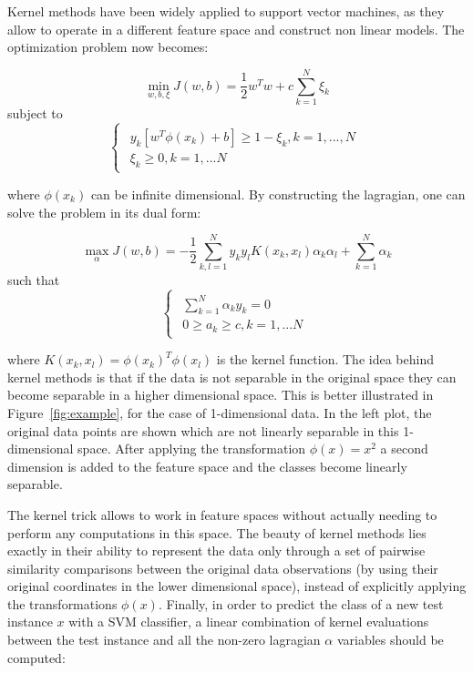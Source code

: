 \documentclass{article}
\begin{document}
Kernel methods have been widely applied to support vector machines, as they allow to operate in a different feature space and construct non linear models. The optimization problem now becomes:

\begin{equation}
\min\limits_{w,b,\xi} J(w,b) = \frac{1}{2}w^Tw + c \sum_{k=1}^{N}\xi_k
\end{equation}
subject to
\begin{equation*}
\begin{cases}
\begin{aligned}
  y_k[w^T\phi(x_k)+b] \geq 1-\xi_k, k=1,...,N \\
  \xi_k \geq 0, k =1,...N
\end{aligned}
\end{cases}
\end{equation*}

where $\phi(x_k)$ can be infinite dimensional. By constructing the lagragian, one can solve the problem in its dual form:


\begin{equation}
\max\limits_{\alpha} J(w,b) = -\frac{1}{2}\sum_{k,l=1}^{N}y_ky_lK(x_k,x_l)\alpha_k\alpha_l +  \sum_{k=1}^{N}\alpha_k
\end{equation}
such that
\begin{equation*}
\begin{cases}
\begin{aligned}
   \sum_{k=1}^{N}\alpha_ky_k=0 \\
  0 \geq a_k \geq c, k =1,...N
\end{aligned}
\end{cases}
\end{equation*}

where $K(x_k,x_l)=\phi(x_k)^T\phi(x_l)$ is the kernel function. The idea behind kernel methods is that if the data is not separable in the original space they can become separable in a higher dimensional space. This is better illustrated in Figure~\ref{fig:example}, for the case of 1-dimensional data. In the left plot, the original data points are shown which are not linearly separable in this 1-dimensional space. After applying the transformation $\phi(x)=x^2$ a second dimension is added to the feature space and the classes become linearly separable.

The kernel trick allows to work in feature spaces without actually needing to perform any computations in this space. The beauty of kernel methods lies exactly in their ability to represent the data only through a set of pairwise similarity comparisons between the original data observations (by using their original coordinates in the lower dimensional space), instead of explicitly applying the transformations $\phi(x)$. Finally, in order to predict the class of a new test instance $x$ with a SVM classifier, a linear combination of kernel evaluations between the test instance and all the non-zero lagragian $\alpha$ variables should be computed:
  
\end{document}

